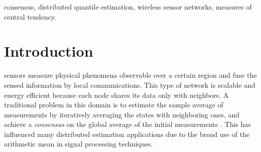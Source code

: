 \documentclass[journal]{IEEEtran}
\begin{document}
\begin{IEEEkeywords}
consensus, distributed quantile estimation, wireless sensor networks, measures of central tendency.
\end{IEEEkeywords}






%
\IEEEpeerreviewmaketitle


\section{Introduction} \label{introduction}


 sensors measure physical phenomena observable over a certain region and fuse the sensed information by local communications. This type of network is scalable and energy efficient because each node shares its data only with neighbors. A traditional problem in this domain is to estimate the sample average of measurements by iteratively averaging the states with neighboring ones, and achieve a \emph{consensus} on the global average of the initial measurements \cite{Boyd2004,Xiao2005,Olfati2007}. This has influenced many distributed estimation applications due to the broad use of the arithmetic mean in signal processing techniques.
\end{document}
